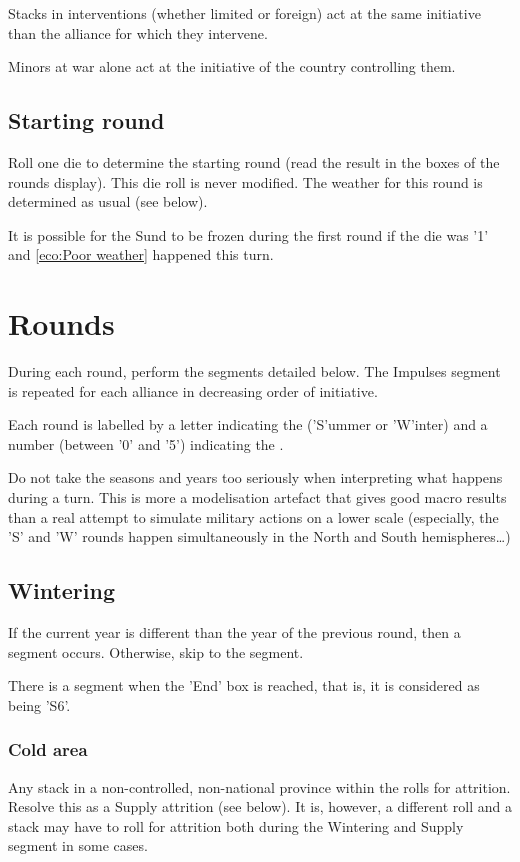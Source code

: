 Stacks in interventions (whether limited or foreign) act at the same
initiative than the alliance for which they intervene.

Minors at war alone act at the initiative of the country controlling them.

\subsection{Starting round}
Roll one die to determine the starting round (read the result in the boxes of
the rounds display). This die roll is never modified. The weather for this
round is determined as usual (see below).

It is possible for the Sund to be frozen during the first round if the die was
'1' and \ref{eco:Poor weather} happened this turn.

\section{Rounds}
\label{chMilitary:Rounds}
During each round, perform the segments detailed below. The Impulses segment
is repeated for each alliance in decreasing order of initiative.

Each round is labelled by a letter indicating the  ('S'ummer or
'W'inter) and a number (between '0' and '5') indicating the .

\begin{designnote}
  Do not take the seasons and years too seriously when interpreting what
  happens during a turn. This is more a modelisation artefact that gives good
  macro results than a real attempt to simulate military actions on a lower
  scale (especially, the 'S' and 'W' rounds happen simultaneously in the North
  and South hemispheres\ldots)
\end{designnote}

\subsection{Wintering}
\label{chMilitary:Rounds:Wintering}
If the current year is different than the year of the previous round, then a
 segment occurs. Otherwise, skip to the 
segment.

There is a  segment when the 'End' box is reached, that is,
it is considered as being 'S6'.

\subsubsection{Cold area}
Any stack in a non-controlled, non-national province within the  rolls for attrition. Resolve this as a Supply attrition (see
below). It is, however, a different roll and a stack may have to roll for
attrition both during the Wintering and Supply segment in some cases.

